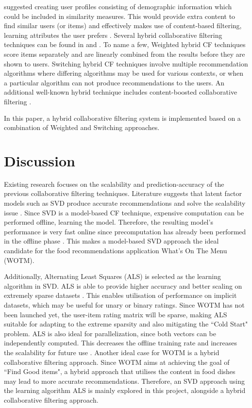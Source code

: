 \citeauthor{toward} \cite{toward} suggested creating user profiles consisting of demographic information which could be included in similarity measures. This would provide extra content to find similar users (or items) and effectively makes use of content-based filtering, learning attributes the user prefers \cite{toward}. Several hybrid collaborative filtering techniques can be found in \cite{toward} and \cite{spiegel2010hybrid}. To name a few, Weighted \cite{spiegel2010hybrid} hybrid CF techniques score items separately and are linearly combined from the results before they are shown to users. Switching \cite{spiegel2010hybrid} hybrid CF techniques involve multiple recommendation algorithms where differing algorithms may be used for various contexts, or when a particular algorithm can not produce recommendations to the users. An additional well-known hybrid technique includes content-boosted collaborative filtering \cite{hybrid}.

In this paper, a hybrid collaborative filtering system is implemented based on a combination of Weighted \cite{spiegel2010hybrid} and Switching \cite{spiegel2010hybrid} approaches. 

\section{Discussion}

Existing research focuses on the scalability and prediction-accuracy of the previous collaborative filtering techniques. Literature suggests that latent factor models such as SVD produce accurate recommendations and solve the scalability issue \cite{netflix_course, abergerrecommender, abergerrecommender}. Since SVD is a model-based CF technique, expensive computation can be performed offline, learning the model. Therefore, the resulting model's  performance is very fast online since precomputation has already been performed in the offline phase \cite{schafer2007collaborative}. This makes a model-based SVD approach the ideal candidate for the food recommendations application What's On The Menu (WOTM). 

Additionally, Alternating Least Squares (ALS) is selected as the learning algorithm in SVD. ALS is able to provide higher accuracy and better scaling on extremely sparse datasets \cite{abergerrecommender, koren2009matrix}. This enables utilisation of performance on implicit datasets, which may be useful for unary or binary ratings. Since WOTM has not been launched yet, the user-item rating matrix will be sparse, making ALS suitable for adapting to the extreme sparsity and also mitigating the ``Cold Start" problem. ALS is also ideal for parallelization, since both vectors can be independently computed. This decreases the offline training rate and increases the scalability for future use \cite{koren2009matrix}. Another ideal case for WOTM is a hybrid collaborative filtering approach. Since WOTM aims at achieving the goal of ``Find Good items", a hybrid approach that utilises the content in food dishes may lead to more accurate recommendations. Therefore, an SVD approach using the learning algorithm ALS is mainly explored in this project, alongside a hybrid collaborative filtering approach. 

